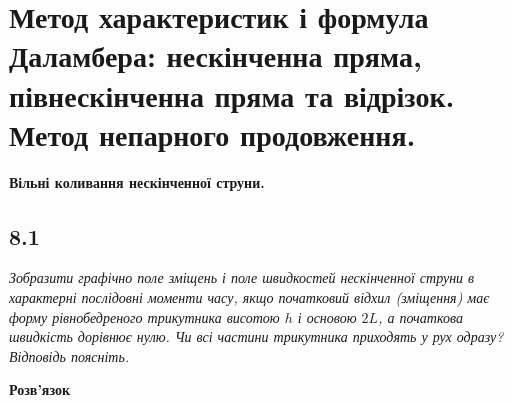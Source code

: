 \documentclass[a4paper, 14pt]{extreport}
\begin{document}
\chapter{Метод характеристик і формула Даламбера: нескінченна пряма, півнескінченна пряма та відрізок. Метод непарного продовження.}

\textbf{\large Вільні коливання нескінченної струни.}

\section[Задача №8.1]{8.1}

\textit{Зобразити графічно поле зміщень і поле швидкостей нескінченної струни в характерні послідовні моменти часу, якщо початковий відхил (зміщення) має форму рівнобедреного трикутника висотою $h$ і основою $2L$, а початкова швидкість дорівнює нулю. Чи всі частини трикутника приходять у рух одразу? Відповідь поясніть.}

\begin{center}
    \large{\textbf{Розв'язок}}
\end{center}
\end{document}
